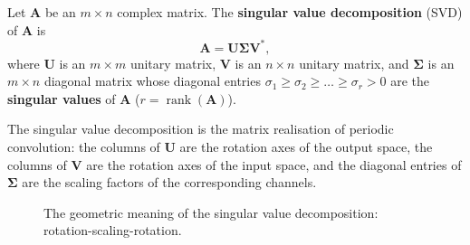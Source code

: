 \begin{definition}\label{def:svd}
Let $\mathbf{A}$ be an $m \times n$ complex matrix. The \textbf{singular value decomposition} (SVD) of $\mathbf{A}$ is
\[
\mathbf{A} = \mathbf{U} \boldsymbol{\Sigma} \mathbf{V}^*,
\]
where $\mathbf{U}$ is an $m \times m$ unitary matrix, $\mathbf{V}$ is an $n \times n$ unitary matrix, and $\boldsymbol{\Sigma}$ is an $m \times n$ diagonal matrix whose diagonal entries $\sigma_1 \ge \sigma_2 \ge \dots \ge \sigma_r > 0$ are the \textbf{singular values} of $\mathbf{A}$ ($r = \operatorname{rank}(\mathbf{A})$).

The singular value decomposition is the matrix realisation of periodic convolution: the columns of $\mathbf{U}$ are the rotation axes of the output space, the columns of $\mathbf{V}$ are the rotation axes of the input space, and the diagonal entries of $\boldsymbol{\Sigma}$ are the scaling factors of the corresponding channels.
\end{definition}

\begin{figure}[htbp]
\centering
{}
\caption{The geometric meaning of the singular value decomposition: rotation-scaling-rotation.}
\label{fig:svd_geometry}
\end{figure}

